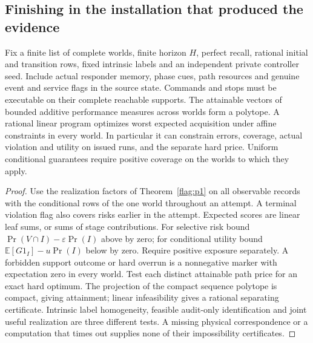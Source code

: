 \subsection{Finishing in the installation that produced the evidence}
\begin{theorem}\label{flag:u1}
Fix a finite list of complete worlds, finite horizon \(H\), perfect recall, rational initial and transition rows, fixed intrinsic labels and an independent private controller seed. Include actual responder memory, phase cues, path resources and genuine event and service flags in the source state. Commands and stops must be executable on their complete reachable supports. The attainable vectors of bounded additive performance measures across worlds form a polytope. A rational linear program optimizes worst expected acquisition under affine constraints in every world. In particular it can constrain errors, coverage, actual violation and utility on issued runs, and the separate hard price. Uniform conditional guarantees require positive coverage on the worlds to which they apply.
\end{theorem}
\begin{proof}
Use the realization factors of Theorem~\ref{flag:p1} on all observable records with the conditional rows of the one world throughout an attempt. A terminal violation flag also covers risks earlier in the attempt. Expected scores are linear leaf sums, or sums of stage contributions. For selective risk bound \(\Pr(V\cap I)-\varepsilon\Pr(I)\) above by zero; for conditional utility bound \(\mathbb E[G1_I]-u\Pr(I)\) below by zero. Require positive exposure separately. A forbidden support outcome or hard overrun is a nonnegative marker with expectation zero in every world. Test each distinct attainable path price for an exact hard optimum. The projection of the compact sequence polytope is compact, giving attainment; linear infeasibility gives a rational separating certificate. Intrinsic label homogeneity, feasible audit-only identification and joint useful realization are three different tests. A missing physical correspondence or a computation that times out supplies none of their impossibility certificates.
\end{proof}

